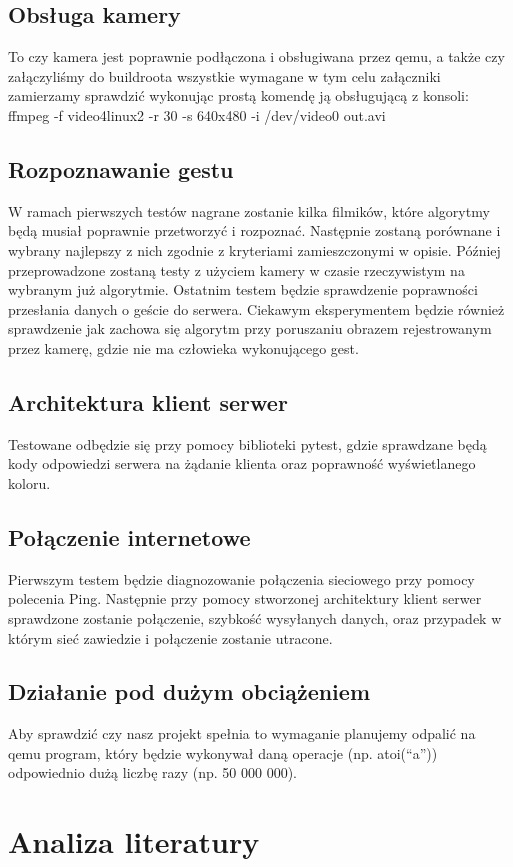 \documentclass{article}
\begin{document}
\subsection{Obsługa kamery}
To czy kamera jest poprawnie podłączona i obsługiwana przez qemu, a także czy załączyliśmy do buildroota wszystkie wymagane w tym celu załączniki zamierzamy sprawdzić wykonując prostą komendę ją obsługującą z konsoli:
        ffmpeg -f video4linux2 -r 30 -s 640x480 -i /dev/video0 out.avi
\subsection{Rozpoznawanie gestu}
W ramach pierwszych testów nagrane zostanie kilka filmików, które algorytmy będą musiał poprawnie przetworzyć i rozpoznać. Następnie zostaną porównane i wybrany najlepszy z nich zgodnie z kryteriami zamieszczonymi w opisie.  Później przeprowadzone zostaną testy z użyciem kamery w czasie rzeczywistym na wybranym już algorytmie. Ostatnim testem będzie sprawdzenie poprawności przesłania danych o geście do serwera. Ciekawym eksperymentem będzie również sprawdzenie jak zachowa się algorytm przy poruszaniu obrazem rejestrowanym przez kamerę, gdzie nie ma człowieka wykonującego gest.
\subsection{Architektura klient serwer}
Testowane odbędzie się przy pomocy biblioteki pytest, gdzie sprawdzane będą kody odpowiedzi serwera na żądanie klienta oraz poprawność wyświetlanego koloru.
\subsection{Połączenie internetowe}
Pierwszym testem będzie diagnozowanie połączenia sieciowego przy pomocy polecenia Ping. Następnie przy pomocy stworzonej architektury klient serwer sprawdzone zostanie połączenie, szybkość wysyłanych danych, oraz przypadek w którym sieć zawiedzie i połączenie zostanie utracone.
\subsection{Działanie pod dużym obciążeniem}
Aby sprawdzić czy nasz projekt spełnia to wymaganie planujemy odpalić na qemu program, który będzie wykonywał daną operacje (np. atoi(“a”)) odpowiednio dużą liczbę razy (np. 50 000 000).
\section{Analiza literatury}
\end{document}
